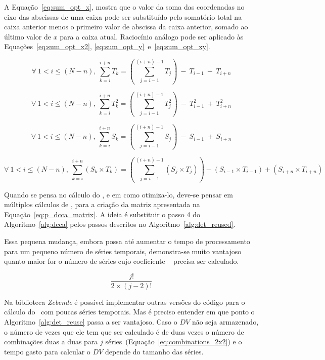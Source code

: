 A Equação~\ref{eq:sum_opt_x}, mostra que o valor da soma das coordenadas no eixo das abscissas de uma caixa pode ser substituído pelo somatório total na caixa anterior menos o primeiro valor de abscissa da caixa anterior, somado ao último valor de $x$ para a caixa atual. Raciocínio análogo pode ser aplicado às Equações~\ref{eq:sum_opt_x2}, \ref{eq:sum_opt_y}~e~\ref{eq:sum_opt_xy}.

\begin{equation}
    \label{eq:sum_opt_x}
    \forall~1<i\leq(N-n),~\sum_{k=i}^{i + n}T_k = \left(\sum_{j=i-1}^{(i+n)-1}T_j\right)~-~T_{i-1}~+~T_{i + n}
  \end{equation}
  
  \begin{equation}
    \label{eq:sum_opt_x2}
    \forall~1<i\leq(N-n),~\sum_{k=i}^{i + n}T_k^2 = \left(\sum_{j=i-1}^{(i+n)-1}T_j^2\right)~-~T_{i-1}^2~+~T_{i + n}^2
  \end{equation}
  
  \begin{equation}
    \label{eq:sum_opt_y}
    \forall~1<i\leq(N-n),~\sum_{k=i}^{i + n}S_k = \left(\sum_{j=i-1}^{(i+n)-1}S_j\right)~-~S_{i-1}~+~S_{i + n}
  \end{equation}
  
  \begin{equation}
    \label{eq:sum_opt_xy}
    \forall~1<i\leq(N-n),~\sum_{k=i}^{i + n} (S_k\times T_k) = \left(\sum_{j=i-1}^{(i+n)-1}(S_j \times T_j)\right)-(S_{i-1} \times T_{i-1})+(S_{i + n} \times T_{i + n})
  \end{equation}

Quando se pensa no cálculo do \dmc, e em como otimiza-lo, deve-se pensar em múltiplos cálculos de \pdcca, para a criação da matriz apresentada na Equação~\ref{eq:p_dcca_matrix}. A ideia é substituir o passo 4 do Algoritmo~\ref{alg:dcca} pelos passos descritos no Algoritmo~\ref{alg:det_reused}.



Essa pequena mudança, embora possa até aumentar o tempo de processamento para um pequeno número de séries temporais, demonstra-se muito vantajoso quanto maior for o número de séries cujo coeficiente \pdcca~ precisa ser calculado.

\begin{equation}\label{eq:combinations_2x2}
  \frac{j!}{2 \times (j-2)!}
\end{equation}

Na biblioteca \emph{Zebende} é possível implementar outras versões do código para o cálculo do \pdcca~com poucas séries temporais. Mas é preciso entender em que ponto o Algoritmo~\ref{alg:det_reuse} passa a ser vantajoso. Caso o $DV$ não seja armazenado, o número de vezes que ele tem que ser calculado é de duas vezes o número de combinações duas a duas para $j$ séries~(Equação~\ref{eq:combinations_2x2}) e o tempo gasto para calcular o $DV$ depende do tamanho das séries.


